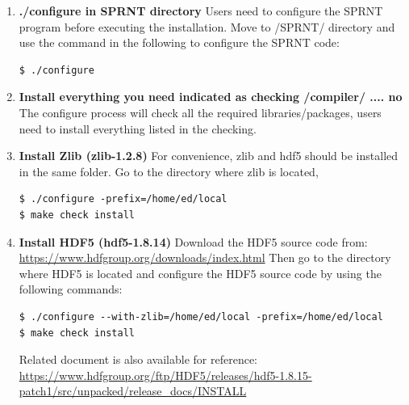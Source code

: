 \documentclass[12pt, letterpaper]{article}
\newcommand{\mybox}{%
    \collectbox{%
        \setlength{\fboxsep}{1pt}%
        \fbox{\BOXCONTENT}%
    }%
}
\begin{document}
\begin{enumerate}
\item \textbf{./configure in SPRNT directory}\newline
Users need to configure the SPRNT program before executing the installation. Move to /SPRNT/ directory and use the command in the following to configure the SPRNT code:\\

\begin{lstlisting}[frame=single]
$ ./configure
\end{lstlisting}

\item \textbf{Install everything you need indicated as checking \mybox{/compiler/ .... no}} \newline
The configure process will check all the required libraries/packages, users need to install everything listed in the checking.

\item \textbf{Install Zlib (zlib-1.2.8)} \newline
For convenience, zlib and hdf5 should be installed in the same folder. Go to the directory where zlib is located,
\begin{lstlisting}[frame=single]
$ ./configure -prefix=/home/ed/local
$ make check install
\end{lstlisting}

\item \textbf{Install HDF5 (hdf5-1.8.14)} \newline
Download the HDF5 source code from: \newline
\url{https://www.hdfgroup.org/downloads/index.html} \newline
Then go to the directory where HDF5 is located and configure the HDF5 source code by using the following commands:
\begin{lstlisting}[frame=single,basicstyle=\footnotesize]
$ ./configure --with-zlib=/home/ed/local -prefix=/home/ed/local
$ make check install
\end{lstlisting}

Related document is also available for reference:\\
\url{https://www.hdfgroup.org/ftp/HDF5/releases/hdf5-1.8.15- patch1/src/unpacked/release_docs/INSTALL}


\end{enumerate}
\end{document}
